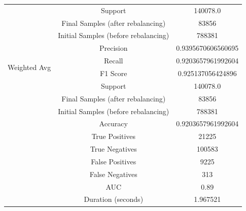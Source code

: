 \begin{longtable}{|c|c|c|}
 & Support & 140078.0 \\
 & Final Samples (after rebalancing) & 83856 \\
 & Initial Samples (before rebalancing) & 788381 \\
\hline
\multirow{4}{*}{Weighted Avg} & Precision & 0.9395670606560695 \\
 & Recall & 0.9203657961992604 \\
 & F1 Score & 0.925137056424896 \\
 & Support & 140078.0 \\
 & Final Samples (after rebalancing) & 83856 \\
 & Initial Samples (before rebalancing) & 788381 \\
\hline
& Accuracy & 0.9203657961992604 \\ \hline
& True Positives & 21225 \\ \hline
& True Negatives & 100583 \\ \hline
& False Positives & 9225 \\ \hline
& False Negatives & 313 \\ \hline
& AUC & 0.89 \\ \hline
& Duration (seconds) & 1.967521 \\ \hline
\end{longtable}


